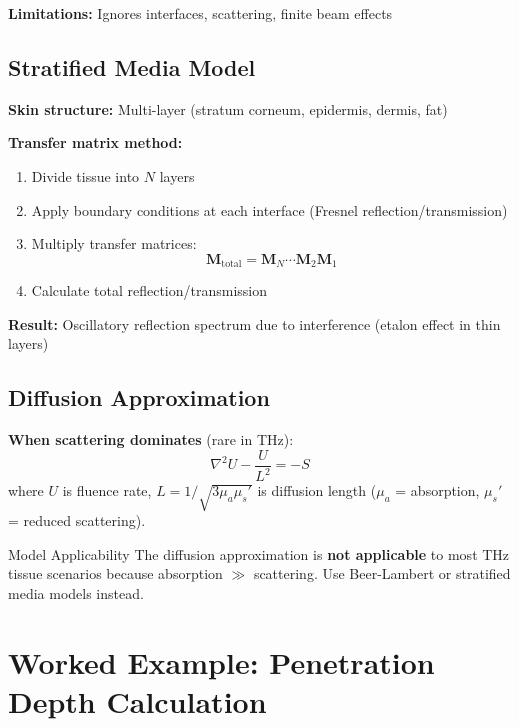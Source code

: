 \textbf{Limitations:} Ignores interfaces, scattering, finite beam effects

\subsection{Stratified Media Model}
\label{subsec:stratified-media}

\textbf{Skin structure:} Multi-layer (stratum corneum, epidermis, dermis, fat)

\textbf{Transfer matrix method:}
\begin{enumerate}
\item Divide tissue into $N$ layers
\item Apply boundary conditions at each interface (Fresnel reflection/transmission)
\item Multiply transfer matrices:
\begin{equation}
\label{eq:transfer-matrix}
\mathbf{M}_{\text{total}} = \mathbf{M}_N \cdots \mathbf{M}_2 \mathbf{M}_1
\end{equation}
\item Calculate total reflection/transmission
\end{enumerate}

\textbf{Result:} Oscillatory reflection spectrum due to interference (etalon effect in thin layers)

\subsection{Diffusion Approximation}
\label{subsec:diffusion}

\textbf{When scattering dominates} (rare in THz):
\begin{equation}
\label{eq:diffusion}
\nabla^2 U - \frac{U}{L^2} = -S
\end{equation}
where $U$ is fluence rate, $L = 1/\sqrt{3\mu_a \mu_s'}$ is diffusion length ($\mu_a$ = absorption, $\mu_s'$ = reduced scattering).

\begin{calloutbox}{Model Applicability}
The diffusion approximation is \textbf{not applicable} to most THz tissue scenarios because absorption $\gg$ scattering. Use Beer-Lambert or stratified media models instead.
\end{calloutbox}

\section{Worked Example: Penetration Depth Calculation}
\label{sec:worked-example}

